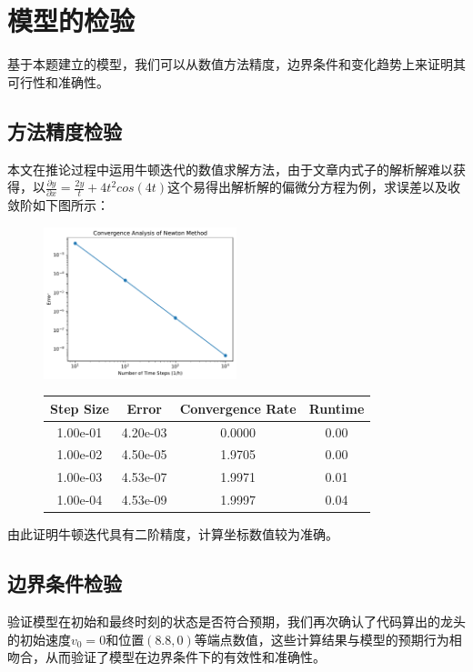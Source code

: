 \documentclass[withoutpreface,bwprint]{cumcmthesis}
\begin{document}
\section{模型的检验}
基于本题建立的模型，我们可以从数值方法精度，边界条件和变化趋势上来证明其可行性和准确性。



\subsection{方法精度检验}
本文在推论过程中运用牛顿迭代的数值求解方法，由于文章内式子的解析解难以获得，以$\frac{\partial y}{\partial x} = \frac{2y}{t}+4t^2cos(4t)$这个易得出解析解的偏微分方程为例，求误差以及收敛阶如下图所示：
\begin{figure}[htbp!]
	\centering
		\includegraphics[width=0.5\textwidth]{pics/newton}
		\label{fig:newton}
\end{figure}
\begin{figure}[htbp!]
	\centering
\begin{tabular}{|c|c|c|c|}
	\hline
Step Size & Error & Convergence Rate & Runtime \\ \hline
1.00e-01 & 4.20e-03  & 0.0000& 0.00 \\ \hline
1.00e-02 & 4.50e-05 & 1.9705 & 0.00 \\ \hline
1.00e-03 & 4.53e-07  & 1.9971 & 0.01 \\ \hline
1.00e-04  & 4.53e-09 & 1.9997 & 0.04 \\ \hline
\end{tabular}
\end{figure}

由此证明牛顿迭代具有二阶精度，计算坐标数值较为准确。
\subsection{边界条件检验}
验证模型在初始和最终时刻的状态是否符合预期，我们再次确认了代码算出的龙头的初始速度$v_0=0$和位置$(8.8, 0)$等端点数值，这些计算结果与模型的预期行为相吻合，从而验证了模型在边界条件下的有效性和准确性。
\end{document}
